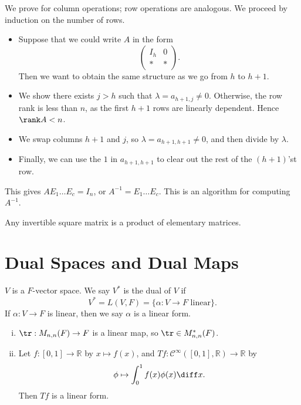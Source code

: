 \documentclass[12pt]{article}
\begin{document}
\begin{proofbox}
	We prove for column operations; row operations are analogous. We proceed by induction on the number of rows.
\begin{itemize}
	\item Suppose that we could write $A$ in the form
		\[
		\begin{pmatrix}
			I_h & 0 \\
			\ast & \ast
		\end{pmatrix}
		.\]
		Then we want to obtain the same structure as we go from $h$ to $h + 1$.
	\item We show there exists $j > h$ such that $\lambda = a_{h+1, j} \neq 0$. Otherwise, the row rank is less than $n$, as the first $h+1$ rows are linearly dependent. Hence $\rank A < n$.
	\item We swap columns $h + 1$ and $j$, so $\lambda = a_{h+1,h+1} \neq 0$, and then divide by $\lambda$.
	\item Finally, we can use the $1$ in $a_{h+1, h+1}$ to clear out the rest of the $(h+1)$'st row.
\end{itemize}
\end{proofbox}

This gives $A E_1 \ldots E_c = I_n$, or $A^{-1} = E_1 \ldots E_c$. This is an algorithm for computing $A^{-1}$.

\begin{proposition}
	Any invertible square matrix is a product of elementary matrices.
\end{proposition}

\newpage

\section{Dual Spaces and Dual Maps}%
\label{sec:dual_spaces_and_dual_maps}

\begin{definition}
	$V$ is a $F$-vector space. We say $V^{\ast}$ is the dual of $V$ if
	\[
		V^{\ast} = L(V, F) = \{ \alpha : V \to F \text{ linear}\}
	.\]
	If $\alpha : V \to F$ is linear, then we say $\alpha$ is a linear form.
\end{definition}

\begin{exbox}
	\begin{enumerate}[(i)]
		\item $\tr : M_{n, n}(F) \to F$ is a linear map, so $\tr \in M_{n,n}^{\ast}(F)$.
		\item Let $f : [0, 1] \to \mathbb{R}$ by $x \mapsto f(x)$, and $Tf : \mathcal{C}^{\infty}([0,1], \mathbb{R}) \to \mathbb{R}$ by
			\[
				\phi \mapsto \int_{0}^{1} f(x)\phi(x)\diff x
			.\]
			Then $Tf$ is a linear form.
	\end{enumerate}
\end{exbox}
\end{document}
